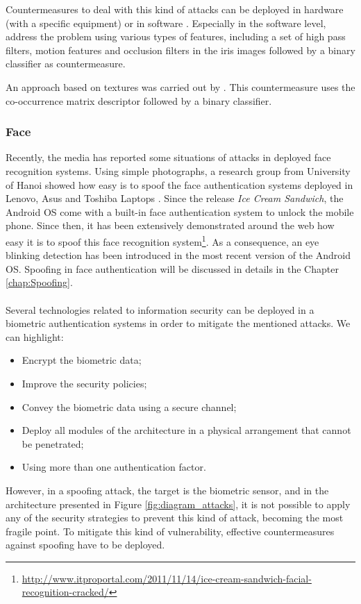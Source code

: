 Countermeasures to deal with this kind of attacks can be deployed in hardware (with a specific equipment) or in software \citep{Galbally_ICB-2012}. Especially in the software level, \cite{Galbally_ICB-2012} address the problem using various types of features, including a set of  high pass filters, motion features and occlusion filters in the iris images followed by a binary classifier as countermeasure. 

An approach based on textures was carried out by \cite{ZhuoshiWei}. This countermeasure uses the co-occurrence matrix descriptor followed by a binary classifier.


\subsubsection{Face}

Recently, the media has reported some situations of attacks in deployed face recognition systems. Using simple photographs, a research group from University of Hanoi showed how easy is to spoof the face authentication systems deployed in Lenovo, Asus and Toshiba Laptops \citep{BlackHat2009}. Since the release \textit{Ice Cream Sandwich}, the Android OS come with a built-in face authentication system to unlock the mobile phone. Since then, it has been extensively demonstrated around the web how easy it is to spoof this face recognition system\footnote{\url{http://www.itproportal.com/2011/11/14/ice-cream-sandwich-facial-recognition-cracked/}}. As a consequence, an eye blinking detection has been introduced in the most recent version of the Android OS. Spoofing in face authentication will be discussed in details in the Chapter \ref{chap:Spoofing}. \\ \\ 

Several technologies related to information security can be deployed in a biometric authentication systems in order to mitigate the mentioned attacks. We can highlight:
\begin{itemize}
        \item Encrypt the biometric data;
        \item Improve the security policies;
        \item Convey the biometric data using a secure channel;
        \item Deploy all modules of the architecture in a physical arrangement that cannot be penetrated;
        \item Using more than one authentication factor.
\end{itemize}
However, in a spoofing attack, the target is the biometric sensor, and in the architecture presented in Figure \ref{fig:diagram_attacks}, it is not possible to apply any of the security strategies to prevent this kind of attack, becoming the most fragile point. To mitigate this kind of vulnerability, effective countermeasures against spoofing have to be deployed.


